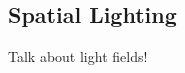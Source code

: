 \documentclass[ %
                    author={Gavin Parker},
                supervisor={Dr. Neill Campbell},
                    degree={MEng},
                     title={Deep Siamese Networks for Illumination Estimation from Stereo Images},
                  subtitle={},
                      type={research},
                      year={2018} ]{dissertation}
\begin{document}
\subsection{Spatial Lighting}
Talk about light fields!



%
%
\end{document}
